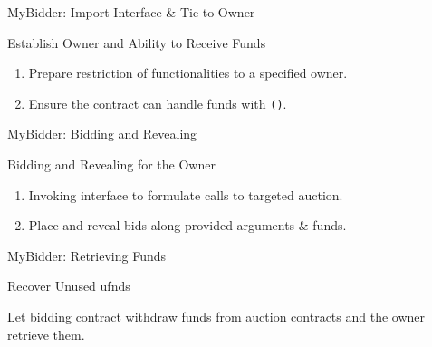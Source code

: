 \documentclass[handout]{beamer}
\begin{document}
\begin{frame}{MyBidder: Import Interface \& Tie to Owner}

\begin{samplecode}{Establish Owner and Ability to Receive Funds}
	
\end{samplecode}
\begin{enumerate}
	\item	Prepare restriction of functionalities to a specified owner.
	\item	Ensure the contract can handle funds with \texttt{()}.
\end{enumerate}

\end{frame}

\begin{frame}{MyBidder: Bidding and Revealing}

\begin{samplecode}{Bidding and Revealing for the Owner}
	
\end{samplecode}
\begin{enumerate}
	\item	Invoking interface to formulate calls to targeted auction.
	\item	Place and reveal bids along provided arguments \& funds.
\end{enumerate}

\end{frame}

\begin{frame}{MyBidder: Retrieving Funds}

\begin{samplecode}{Recover Unused ufnds}
	
\end{samplecode}

\vspace{1em}
Let bidding contract withdraw funds from auction contracts and the owner retrieve them.

\end{frame}
\end{document}
